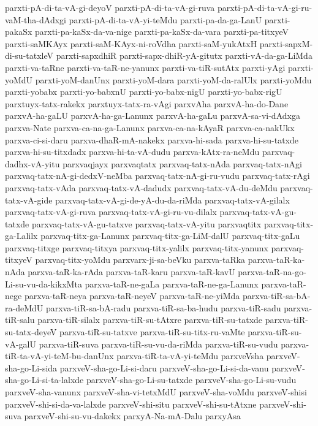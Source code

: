 {parxti-pA-di-ta-vA-gi-deyoV
parxti-pA-di-ta-vA-gi-ruva
parxti-pA-di-ta-vA-gi-ru-vaM-tha-dAdxgi
parxti-pA-di-ta-vA-yi-teMdu
parxti-pa-da-ga-LanU
parxti-pakaSx
parxti-pa-kaSx-da-va-nige
parxti-pa-kaSx-da-vara
parxti-pa-titxyeV
parxti-saMKAyx
parxti-saM-KAyx-ni-roVdha
parxti-saM-yukAtxH
parxti-sapxM-di-su-tatxleV
parxti-sapxdhiR
parxti-sapx-dhiR-yA-gitutx
parxti-vA-da-ga-LiMda
parxti-va-taRne
parxti-va-taR-ne-yanunx
parxti-va-tiR-sutAtx
parxti-yAgi
parxti-yoMdU
parxti-yoM-danUnx
parxti-yoM-dara
parxti-yoM-da-ralUlx
parxti-yoMdu
parxti-yobabx
parxti-yo-babxnU
parxti-yo-babx-nigU
parxti-yo-babx-rigU
parxtuyx-tatx-rakekx
parxtuyx-tatx-ra-vAgi
parxvAha
parxvA-ha-do-Dane
parxvA-ha-gaLU
parxvA-ha-ga-Lanunx
parxvA-ha-gaLu
parxvA-sa-vi-dAdxga
parxva-Nate
parxva-ca-na-ga-Lanunx
parxva-ca-na-kAyaR
parxva-ca-nakUkx
parxva-ci-si-daru
parxva-dhaR-mA-nakekx
parxva-hi-sada
parxva-hi-su-tatxde
parxva-hi-su-titxdadx
parxva-hi-ta-vA-dudu
parxva-kAtx-ra-neMdu
parxvaq-dadhx-vA-yitu
parxvaqjayx
parxvaqtatx
parxvaq-tatx-nAda
parxvaq-tatx-nAgi
parxvaq-tatx-nA-gi-dedxV-neMba
parxvaq-tatx-nA-gi-ru-vudu
parxvaq-tatx-rAgi
parxvaq-tatx-vAda
parxvaq-tatx-vA-dadudx
parxvaq-tatx-vA-du-deMdu
parxvaq-tatx-vA-gide
parxvaq-tatx-vA-gi-de-yA-du-da-riMda
parxvaq-tatx-vA-gilalx
parxvaq-tatx-vA-gi-ruva
parxvaq-tatx-vA-gi-ru-vu-dilalx
parxvaq-tatx-vA-gu-tatxde
parxvaq-tatx-vA-gu-tatxve
parxvaq-tatx-vA-yitu
parxvaqtitx
parxvaq-titx-ga-Lalilx
parxvaq-titx-ga-Lanunx
parxvaq-titx-ga-LiM-dalU
parxvaq-titx-gaLu
parxvaq-titxge
parxvaq-titxya
parxvaq-titx-yalilx
parxvaq-titx-yanunx
parxvaq-titxyeV
parxvaq-titx-yoMdu
parxvarx-ji-sa-beVku
parxva-taRka
parxva-taR-ka-nAda
parxva-taR-ka-rAda
parxva-taR-karu
parxva-taR-kavU
parxva-taR-na-go-Li-su-vu-da-kikxMta
parxva-taR-ne-gaLa
parxva-taR-ne-ga-Lanunx
parxva-taR-nege
parxva-taR-neya
parxva-taR-neyeV
parxva-taR-ne-yiMda
parxva-tiR-sa-bA-ra-deMdU
parxva-tiR-sa-bA-radu
parxva-tiR-sa-ba-hudu
parxva-tiR-sadu
parxva-tiR-salu
parxva-tiR-silalx
parxva-tiR-su-tAtxre
parxva-tiR-su-tatxde
parxva-tiR-su-tatx-deyeV
parxva-tiR-su-tatxve
parxva-tiR-su-titx-ru-vaMte
parxva-tiR-su-vA-galU
parxva-tiR-suva
parxva-tiR-su-vu-da-riMda
parxva-tiR-su-vudu
parxva-tiR-ta-vA-yi-teM-bu-danUnx
parxva-tiR-ta-vA-yi-teMdu
parxveVsha
parxveV-sha-go-Li-sida
parxveV-sha-go-Li-si-daru
parxveV-sha-go-Li-si-da-vanu
parxveV-sha-go-Li-si-ta-lalxde
parxveV-sha-go-Li-su-tatxde
parxveV-sha-go-Li-su-vudu
parxveV-sha-vanunx
parxveV-sha-vi-tetxMdU
parxveV-sha-voMdu
parxveV-shisi
parxveV-shi-si-da-va-lalxde
parxveV-shi-situ
parxveV-shi-su-tAtxne
parxveV-shi-suva
parxveV-shi-su-vu-dakekx
parxyA-Na-mA-Dalu
parxyAsa
}
